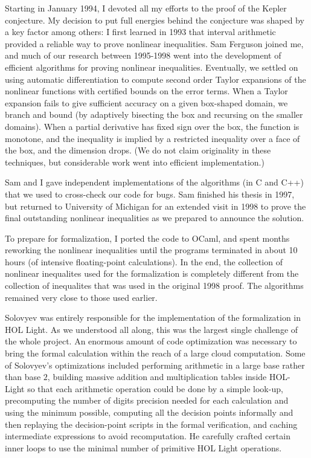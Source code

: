 \documentclass{amsart}
\begin{document}
Starting in January 1994, I devoted all my efforts to the proof of the
Kepler conjecture.  My decision to put full energies behind the
conjecture was shaped by a key factor among others: I first learned in
1993 that interval arithmetic provided a reliable way to prove
nonlinear inequalities.  Sam Ferguson joined me, and much of our
research between 1995-1998 went into the development of efficient
algorithms for proving nonlinear inequalities.  Eventually, we settled
on using automatic differentiation to compute second order Taylor
expansions of the nonlinear functions with certified bounds on the
error terms.  When a Taylor expansion fails to give sufficient
accuracy on a given box-shaped domain, we branch and bound (by adaptively bisecting the
box and recursing on the smaller domains).  When a partial
derivative has fixed sign over the box, the function is
monotone, and the inequality is implied by a restricted inequality over a face
of the box, and the dimension drops.  (We do not claim
originality in these techniques, but considerable work went into
efficient implementation.)

Sam and I gave independent implementations of the algorithms (in C and
C++) that we used to cross-check our code for bugs. Sam finished his
thesis in 1997, but returned to University of Michigan for an
extended visit in 1998 to prove the final outstanding nonlinear
inequalities as we prepared to announce the solution.

To prepare for formalization, I ported the code to OCaml, and spent
months reworking the nonlinear inequalities until the programs
terminated in about 10 hours (of intensive floating-point
calculations).  In the end, the collection of nonlinear inequalites
used for the formalization is completely different from the collection
of inequalites that was used in the original 1998 proof.
The algorithms remained very close to those used earlier.

Solovyev was entirely responsible for the implementation of the
formalization in HOL Light.  As we understood all along, this was the
largest single challenge of the whole project.  An enormous amount of
code optimization was necessary to bring the formal calculation within
the reach of a large cloud computation.  Some of Solovyev's
optimizations included performing arithmetic in a large base rather
than base $2$, building massive addition and multiplication tables
inside HOL-Light so that each arithmetic operation could be done by a
simple look-up, precomputing the number of digits precision needed for
each calculation and using the minimum possible, computing all the
decision points informally and then replaying the decision-point
scripts in the formal verification, and caching intermediate
expressions to avoid recomputation.  He carefully crafted certain
inner loops to use the minimal number of primitive HOL Light
operations.
\end{document}
